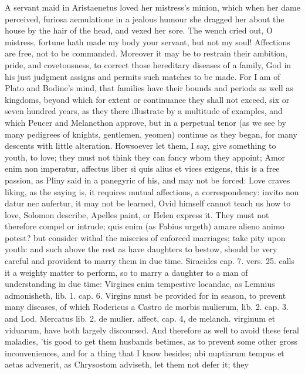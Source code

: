 {A servant maid in Aristaenetus loved her mistress's minion, which
when her dame perceived, furiosa aemulatione in a jealous humour she
dragged her about the house by the hair of the head, and vexed her
sore. The wench cried out, O mistress, fortune hath made my body
your servant, but not my soul! Affections are free, not to be
commanded. Moreover it may be to restrain their ambition, pride, and
covetousness, to correct those hereditary diseases of a family, God in
his just judgment assigns and permits such matches to be made. For I am
of Plato and  Bodine's mind, that families have their bounds and
periods as well as kingdoms, beyond which for extent or continuance
they shall not exceed, six or seven hundred years, as they there
illustrate by a multitude of examples, and which Peucer and
Melancthon approve, but in a perpetual tenor (as we see by many
pedigrees of knights, gentlemen, yeomen) continue as they began, for
many descents with little alteration. Howsoever let them, I say, give
something to youth, to love; they must not think they can fancy whom
they appoint; Amor enim non imperatur, affectus liber si quis
alius et vices exigens, this is a free passion, as Pliny said in a
panegyric of his, and may not be forced: Love craves liking, as the
saying is, it requires mutual affections, a correspondency: invito non
datur nec aufertur, it may not be learned, Ovid himself cannot teach us
how to love, Solomon describe, Apelles paint, or Helen express it. They
must not therefore compel or intrude; quis enim (as Fabius
urgeth) amare alieno animo potest? but consider withal the miseries of
enforced marriages; take pity upon youth: and such above the rest as
have daughters to bestow, should be very careful and provident to marry
them in due time. Siracides cap. 7. vers. 25. calls it a weighty matter
to perform, so to marry a daughter to a man of understanding in due
time: Virgines enim tempestive locandae, as Lemnius admonisheth,
lib. 1. cap. 6. Virgins must be provided for in season, to prevent many
diseases, of which Rodericus a Castro de morbis mulierum, lib. 2.
cap. 3. and Lod. Mercatus lib. 2. de mulier. affect, cap. 4, de
melanch. virginum et viduarum, have both largely discoursed. And
therefore as well to avoid these feral maladies, 'tis good to get them
husbands betimes, as to prevent some other gross inconveniences, and
for a thing that I know besides; ubi nuptiarum tempus et aetas
advenerit, as Chrysostom adviseth, let them not defer it; they
}
